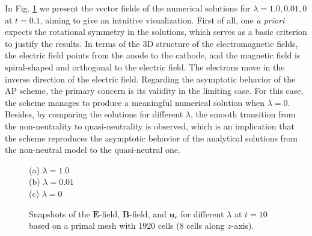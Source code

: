 \documentclass{article}
\begin{document}
In Fig. \ref{fig:3d_vec_field_E_B_ue} we present the vector fields of the numerical solutions for $\lambda = 1.0, 0.01, 0$ at $t = 0.1$, aiming to give an intuitive visualization. First of all, one \emph{a priori} expects the rotational symmetry in the solutions, which serves as a basic criterion to justify the results. In terms of the 3D structure of the electromagnetic fields, the electric field points from the anode to the cathode, and the magnetic field is spiral-shaped and orthogonal to the electric field. The electrons move in the inverse direction of the electric field. Regarding the asymptotic behavior of the AP scheme, the primary concern is its validity in the limiting case. For this case, the scheme manages to produce a meaningful numerical solution when $\lambda = 0$. Besides, by comparing the solutions for different $\lambda$, the smooth transition from the non-neutrality to quasi-neutrality is observed, which is an implication that the scheme reproduces the asymptotic behavior of the analytical solutions from the non-neutral model to the quasi-neutral one.
\begin{figure}
    \centering
    (a) $\lambda = 1.0$ \\
    (b) $\lambda = 0.01$ \\
    (c) $\lambda = 0$
    \caption{Snapshots of the $\mathbf{E}$-field, $\mathbf{B}$-field, and $\mathbf{u}_e$ for different $\lambda$ at $t = 10$ based on a primal mesh with 1920 cells (8 cells along $z$-axis). } 
    \label{fig:3d_vec_field_E_B_ue}
\end{figure}
\end{document}
